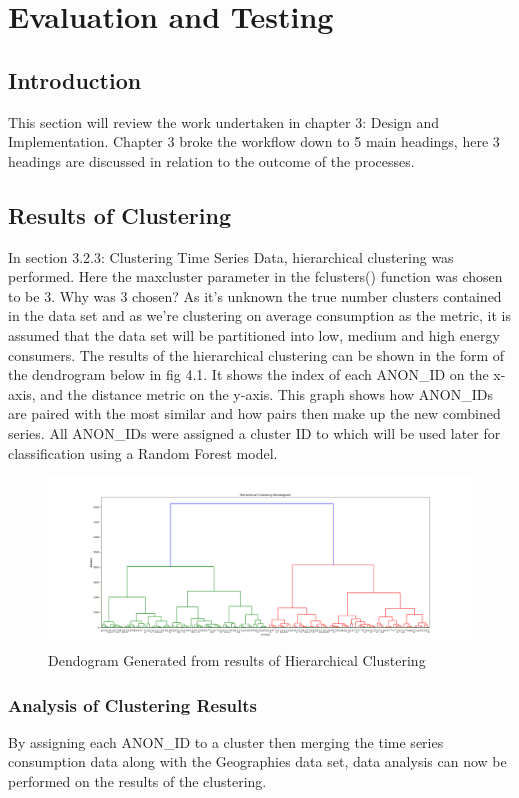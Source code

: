 \chapter{Evaluation and Testing}
\section{Introduction}
This section will review the work undertaken in chapter 3: Design and Implementation. Chapter 3 broke the workflow down to 5 main headings, here 3 headings are discussed in relation to the outcome of the processes.

\section{Results of Clustering}
In section 3.2.3: Clustering Time Series Data, hierarchical clustering was performed. Here the maxcluster parameter in the fclusters() function was chosen to be 3. Why was 3 chosen? As it's unknown the true number clusters contained in the data set and as we're clustering on average consumption as the metric, it is assumed that the data set will be partitioned into low, medium and high energy consumers. The results of the hierarchical clustering can be shown in the form of the dendrogram below in fig 4.1. It shows the index of each ANON\_ID on the x-axis, and the distance metric on the y-axis. This graph shows how ANON\_IDs are paired with the most similar and how pairs then make up the new combined series. All ANON\_IDs were assigned a cluster ID to which will be used later for classification using a Random Forest model.
\begin{figure}
\centering     
\includegraphics[width=1.5\textwidth, angle=90]{Figures/clusters_time_series.png}
\caption{Dendogram Generated from results of Hierarchical Clustering}
\label{fig:Dendrogram}
\end{figure} 

\subsection{Analysis of Clustering Results}
By assigning each ANON\_ID to a cluster then merging the time series consumption data along with the Geographies data set, data analysis can now be performed on the results of the clustering.

